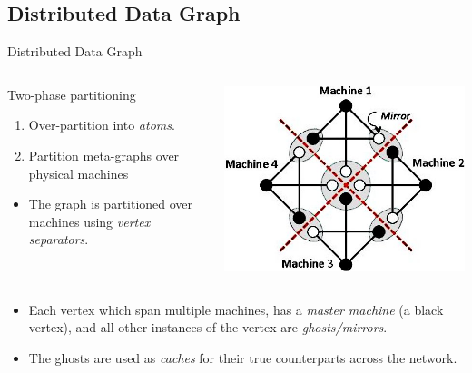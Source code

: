 \documentclass[onlymath,xcolor=pdftex,dvipsnames,table]{beamer}
\let\oldemph\emph
\renewcommand{\emph}[1]{{\color{Blue}\oldemph{#1}}}
\theoremstyle{remark} %
\begin{document}
\subsection{Distributed Data Graph}
\begin{frame}{Distributed Data Graph}
\begin{columns}
  \begin{column}{0.5\textwidth}
    Two-phase partitioning
    \begin{enumerate}
      \item Over-partition into \emph{atoms}.
      \item Partition meta-graphs over physical machines
    \end{enumerate}
    \begin{itemize}
      \item The graph is partitioned over machines using \emph{vertex separators}.
    \end{itemize}
  \end{column}
  \begin{column}{0.4\textwidth}
    \centering
    \includegraphics[width=\columnwidth]{partition.jpg}
  \end{column}
\end{columns}
\begin{itemize}
  \item Each vertex which span multiple machines, has a \emph{master machine} (a black vertex), and all other instances of the vertex are \emph{ghosts/mirrors}.
  \item The ghosts are used as \emph{caches} for their true counterparts across the network.
\end{itemize}
\end{frame}
\end{document}
